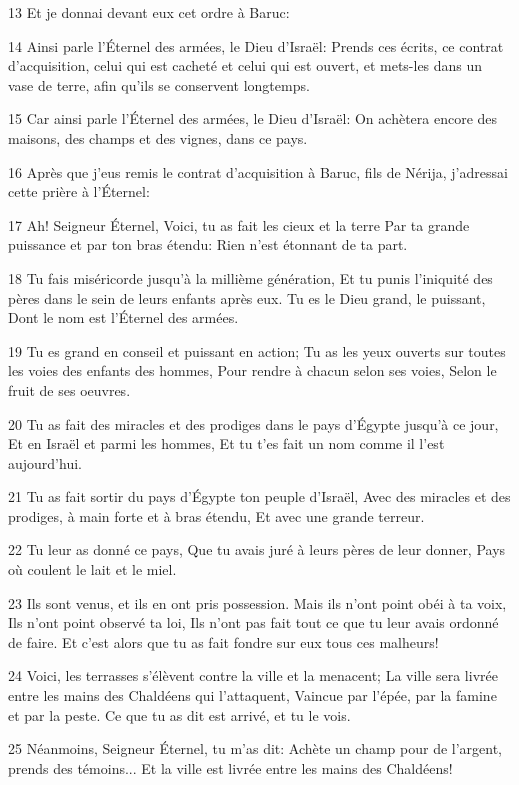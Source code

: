 \par 13 Et je donnai devant eux cet ordre à Baruc:
\par 14 Ainsi parle l'Éternel des armées, le Dieu d'Israël: Prends ces écrits, ce contrat d'acquisition, celui qui est cacheté et celui qui est ouvert, et mets-les dans un vase de terre, afin qu'ils se conservent longtemps.
\par 15 Car ainsi parle l'Éternel des armées, le Dieu d'Israël: On achètera encore des maisons, des champs et des vignes, dans ce pays.
\par 16 Après que j'eus remis le contrat d'acquisition à Baruc, fils de Nérija, j'adressai cette prière à l'Éternel:
\par 17 Ah! Seigneur Éternel, Voici, tu as fait les cieux et la terre Par ta grande puissance et par ton bras étendu: Rien n'est étonnant de ta part.
\par 18 Tu fais miséricorde jusqu'à la millième génération, Et tu punis l'iniquité des pères dans le sein de leurs enfants après eux. Tu es le Dieu grand, le puissant, Dont le nom est l'Éternel des armées.
\par 19 Tu es grand en conseil et puissant en action; Tu as les yeux ouverts sur toutes les voies des enfants des hommes, Pour rendre à chacun selon ses voies, Selon le fruit de ses oeuvres.
\par 20 Tu as fait des miracles et des prodiges dans le pays d'Égypte jusqu'à ce jour, Et en Israël et parmi les hommes, Et tu t'es fait un nom comme il l'est aujourd'hui.
\par 21 Tu as fait sortir du pays d'Égypte ton peuple d'Israël, Avec des miracles et des prodiges, à main forte et à bras étendu, Et avec une grande terreur.
\par 22 Tu leur as donné ce pays, Que tu avais juré à leurs pères de leur donner, Pays où coulent le lait et le miel.
\par 23 Ils sont venus, et ils en ont pris possession. Mais ils n'ont point obéi à ta voix, Ils n'ont point observé ta loi, Ils n'ont pas fait tout ce que tu leur avais ordonné de faire. Et c'est alors que tu as fait fondre sur eux tous ces malheurs!
\par 24 Voici, les terrasses s'élèvent contre la ville et la menacent; La ville sera livrée entre les mains des Chaldéens qui l'attaquent, Vaincue par l'épée, par la famine et par la peste. Ce que tu as dit est arrivé, et tu le vois.
\par 25 Néanmoins, Seigneur Éternel, tu m'as dit: Achète un champ pour de l'argent, prends des témoins... Et la ville est livrée entre les mains des Chaldéens!
